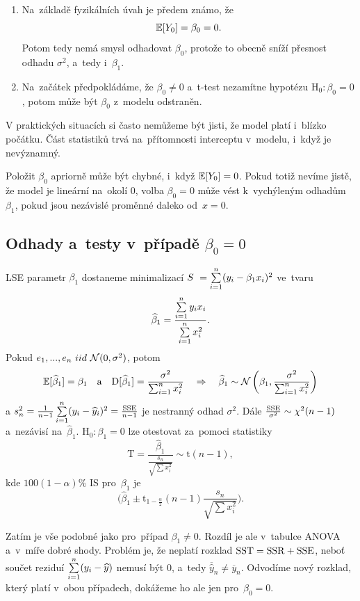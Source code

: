  \begin{enumerate}[1.]
  \item Na~základě fyzikálních úvah je předem známo, že
 $$
 \mathbb{E} [Y_0] = \beta_0 = 0.
 $$
		Potom tedy nemá smysl odhadovat $\beta_0$, protože to obecně sníží přesnost odhadu $\sigma^2$, a~tedy i~$\beta_1$.
  \item Na~začátek předpokládáme, že $\beta_0 \neq 0$ a~t-test nezamítne hypotézu $\text{H}_0 : \beta_0 = 0$, potom může být $\beta_0$ z~modelu odstraněn.
\end{enumerate}

\begin{remark}
V praktických situacích si často nemůžeme být jisti, že model platí i~blízko počátku. Část statistiků trvá na~přítomnosti interceptu v~modelu, i~když je nevýznamný.

Položit $\beta_0$ apriorně může být chybné, i~když $\mathbb{E} [Y_0] = 0$. Pokud totiž nevíme jistě, že model je lineární na~okolí 0, volba $\beta_0 = 0$ může vést k~vychýleným odhadům $\beta_1$, pokud jsou nezávislé proměnné daleko od~$x = 0$.
\end{remark}

\subsection{Odhady a~testy v~případě $\beta_0 = 0$ }
LSE parametr $\beta_1$ dostaneme minimalizací $S~ = \sum\limits_{i=1}^{n} (y_i - \beta_1 x_i)^2$ ve~tvaru
 $$
 \widehat{\beta}_1 = \frac{\sum\limits_{i=1}^{n} y_i  x_i }{\sum\limits_{i=1}^{n} x_i^2}.
 $$
Pokud $e_1,..., e_n~iid~\mathcal{N}(0,\sigma^2)$, potom 
$$\mathbb{E} [\widehat{\beta}_1] = \beta_1\quad\text{a}\quad\mathrm{D} [\widehat{\beta}_1] = \frac{\sigma^2}{\sum_{i=1}^n x_i^2}\quad\Rightarrow\quad\widehat{\beta}_1 \sim \mathcal{N}\left(\beta_1, \frac{\sigma^2}{\sum_{i=1}^n x_i^2}\right)$$
a $s_n^2 = \frac{1}{n-1}\sum\limits_{i=1}^{n} (y_i -  \widehat{y}_i)^2 = \frac{\mathrm{SSE}}{n-1}$ je nestranný odhad $\sigma^2$.
Dále $\frac{\mathrm{SSE}}{\sigma^2} \sim \chi^2(n-1)$ a~nezávisí na~$\widehat{\beta}_1$.
 $\text{H}_0 : \beta_1 = 0$ lze otestovat za~pomoci statistiky
 $$
  \mathrm{T} = \frac{\widehat{\beta}_1}{\frac{s_n}{\sqrt{\sum x_i^2}}} \sim \mathrm{t}(n-1),
 $$
kde $100(1-\alpha) \%$ IS pro~$\beta_1$ je $$\bigg(\widehat{\beta}_1 \pm \mathrm{t}_{1 - \frac{\alpha}{2}}(n-1)\frac{s_n}{\sqrt{\sum x_i^2}}\bigg).$$

Zatím je vše podobné jako pro~případ $\beta_1 \neq 0$. Rozdíl je ale v~tabulce ANOVA a~v~míře dobré shody. Problém je, že neplatí rozklad $\mathrm{SST} = \mathrm{SSR} + \mathrm{SSE}$, neboť součet reziduí $\sum\limits_{i=1}^{n} (y_i - \widehat{y})$ nemusí být 0, a~tedy $\overline{\widehat{y}}_n \neq \overline{y}_n$. Odvodíme nový rozklad, který platí v~obou případech, dokážeme ho ale jen pro~$\beta_0 = 0$.

